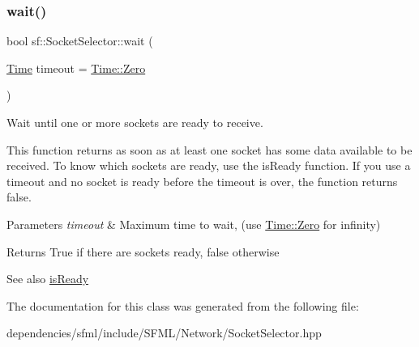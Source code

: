 \subsubsection{\texorpdfstring{wait()}{wait()}}
{\footnotesize\ttfamily bool sf\+::\+Socket\+Selector\+::wait (\begin{DoxyParamCaption}\item[{\hyperlink{classsf_1_1_time}{Time}}]{timeout = {\ttfamily \hyperlink{classsf_1_1_time_a8db127b632fa8da21550e7282af11fa0}{Time\+::\+Zero}} }\end{DoxyParamCaption})}



Wait until one or more sockets are ready to receive. 

This function returns as soon as at least one socket has some data available to be received. To know which sockets are ready, use the is\+Ready function. If you use a timeout and no socket is ready before the timeout is over, the function returns false.


\begin{DoxyParams}{Parameters}
{\em timeout} & Maximum time to wait, (use \hyperlink{classsf_1_1_time_a8db127b632fa8da21550e7282af11fa0}{Time\+::\+Zero} for infinity)\\
\hline
\end{DoxyParams}
\begin{DoxyReturn}{Returns}
True if there are sockets ready, false otherwise
\end{DoxyReturn}
\begin{DoxySeeAlso}{See also}
\hyperlink{classsf_1_1_socket_selector_a917a4bac708290a6782e6686fd3bf889}{is\+Ready} 
\end{DoxySeeAlso}


The documentation for this class was generated from the following file\+:\begin{DoxyCompactItemize}
\item 
dependencies/sfml/include/\+S\+F\+M\+L/\+Network/Socket\+Selector.\+hpp\end{DoxyCompactItemize}
